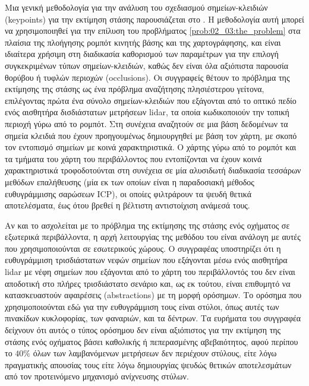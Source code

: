 Μια γενική μεθοδολογία για την ανάλυση του σχεδιασμού σημείων-κλειδιών
(keypoints) για την εκτίμηση στάσης παρουσιάζεται στο \cite{Bosse2009}. Η
μεθοδολογία αυτή μπορεί να χρησιμοποιηθεί για την επίλυση του προβλήματος
\ref{prob:02_03:the_problem} στα πλαίσια της πλοήγησης ρομπότ κινητής βάσης και
της χαρτογράφησης, και είναι ιδιαίτερα χρήσιμη στη διαδικασία καθορισμού των
παραμέτρων για την επιλογή συγκεκριμένων τύπων σημείων-κλειδιών, καθώς δεν
είναι όλα αξιόπιστα παρουσία θορύβου ή τυφλών περιοχών (occlusions). Οι
συγγραφείς θέτουν το πρόβλημα της εκτίμησης της στάσης ως ένα πρόβλημα
αναζήτησης πλησιέστερου γείτονα, επιλέγοντας πρώτα ένα σύνολο σημείων-κλειδιών
που εξάγονται από το οπτικό πεδίο ενός αισθητήρα δισδιάστατων μετρήσεων lidar,
τα οποία κωδικοποιούν την τοπική περιοχή γύρω από το ρομπότ. Στη συνέχεια
αναζητούν σε μια βάση δεδομένων τα σημεία κλειδιά που έχουν προηγουμένως
δημιουργηθεί με βάση τον χάρτη, με σκοπό τον εντοπισμό σημείων με κοινά
χαρακτηριστικά. Ο χάρτης γύρω από το ρομπότ και τα τμήματα του χάρτη του
περιβάλλοντος που εντοπίζονται να έχουν κοινά χαρακτηριστικά τροφοδοτούνται στη
συνέχεια σε μία αλυσιδωτή διαδικασία τεσσάρων μεθόδων επαλήθευσης (μία εκ των
οποίων είναι η παραδοσιακή μέθοδος ευθυγράμμισης σαρώσεων ICP), οι οποίες
φιλτράρουν τα ψευδή θετικά αποτελέσματα, έως ότου βρεθεί η βέλτιστη
αντιστοίχιση ανάμεσά τους.

Αν και το \cite{Brenner2010} ασχολείται με το πρόβλημα της εκτίμησης της στάσης
ενός οχήματος σε εξωτερικά περιβάλλοντα, η αρχή λειτουργίας της μεθόδου του
είναι ανάλογη με αυτές που χρησιμοποιούνται σε εσωτερικούς χώρους.  Ο
συγγραφέας υποστηρίζει ότι η ευθυγράμμιση τρισδιάστατων νεφών σημείων που
εξάγονται μέσω ενός αισθητήρα lidar με νέφη σημείων που εξάγονται από το χάρτη
του περιβάλλοντός του δεν είναι αποδοτική στο πλήρες τρισδιάστατο σενάριο και,
ως εκ τούτου, είναι επιθυμητό να κατασκευαστούν αφαιρέσεις (abstractions) με τη
μορφή ορόσημων. Το ορόσημα που χρησιμοποιούνται εδώ για την ευθυγράμμιση τους
είναι στύλοι, όπως αυτές των πινακίδων κυκλοφορίας, των φαναριών, και τα
δέντρων. Τα ευρήματα του συγγραφέα δείχνουν ότι αυτός ο τύπος ορόσημου δεν
είναι αξιόπιστος για την εκτίμηση της στάσης ενός οχήματος βάσει καθολικής ή
πεπερασμένης αβεβαιότητος, αφού περίπου το $40\%$ όλων των λαμβανόμενων
μετρήσεων δεν περιέχουν στύλους, είτε λόγω πραγματικής απουσίας τους είτε
λόγω δημιουργίας ψευδώς θετικών αποτελεσμάτων από τον προτεινόμενο μηχανισμό
ανίχνευσης στύλων.

